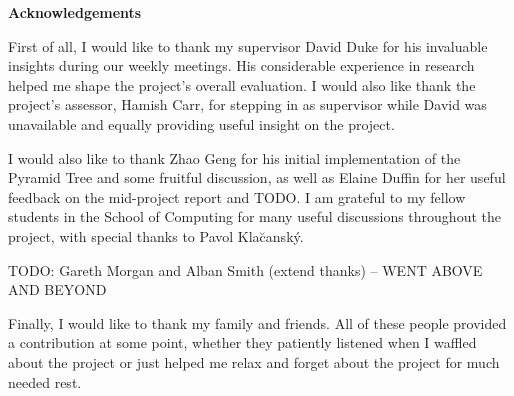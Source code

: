 \begin{center}
    {\LARGE\bf Acknowledgements}
\end{center}

First of all, I would like to thank my supervisor David Duke for his invaluable insights during our weekly meetings. His considerable experience in research helped me shape the project's overall evaluation. I would also like thank the project's assessor, Hamish Carr, for stepping in as supervisor while David was unavailable and equally providing useful insight on the project.

I would also like to thank  Zhao Geng for his initial implementation of the Pyramid Tree and some fruitful discussion, as well as Elaine Duffin for her useful feedback on the mid-project report and TODO. I am grateful to my fellow students in the School of Computing for many useful discussions throughout the project, with special thanks to Pavol Kla\u{c}ansk\'{y}.

TODO: Gareth Morgan and Alban Smith (extend thanks) -- WENT ABOVE AND BEYOND

Finally, I would like to thank my family and friends. All of these people provided a contribution at some point, whether they patiently listened when I waffled about the project or just helped me relax and forget about the project for much needed rest.

